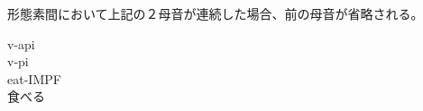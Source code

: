 形態素間において上記の２母音が連続した場合、前の母音が省略される。
\begin{exe}
    \ex \glll v-api \\
    v-pi \\
    eat-IMPF \\
   \glt 食べる
\end{exe}
